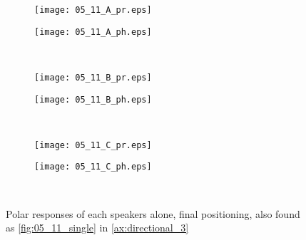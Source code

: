 \begin{figure}[H]
\begin{subfigure}[c]{0.5\textwidth}
\texttt{[image: 05\_11\_A\_pr.eps]}
\label{fig:05_11_A_pr_m}
\end{subfigure}
\begin{subfigure}[c]{0.5\textwidth}
\texttt{[image: 05\_11\_A\_ph.eps]}
\label{fig:05_11_A_ph_m}
\end{subfigure}\\
\hspace{0.1\textheight}
\begin{subfigure}[c]{0.5\textwidth}
\texttt{[image: 05\_11\_B\_pr.eps]}
\label{fig:05_11_B_pr_m}
\end{subfigure}
\begin{subfigure}[c]{0.5\textwidth}
\texttt{[image: 05\_11\_B\_ph.eps]}
\label{fig:05_11_B_ph_m}
\end{subfigure}\\
\hspace{0.1\textheight}
\begin{subfigure}[c]{0.5\textwidth}
\texttt{[image: 05\_11\_C\_pr.eps]}
\label{fig:05_11_C_pr_m}
\end{subfigure}
\begin{subfigure}[c]{0.5\textwidth}
\texttt{[image: 05\_11\_C\_ph.eps]}
\label{fig:05_11_C_ph_m}
\end{subfigure}\\
\caption{Polar responses of each speakers alone, final positioning, also found as \autoref{fig:05_11_single} in \autoref{ax:directional_3}}  
\label{fig:05_11_single_main}
\end{figure}


